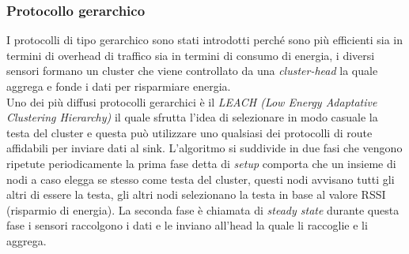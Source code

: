 \subsubsection{Protocollo gerarchico}
I protocolli di tipo gerarchico sono stati introdotti perché sono più efficienti sia in termini di overhead di traffico sia in termini di consumo di energia, i diversi sensori formano un cluster che viene controllato da una \emph{cluster-head} la quale aggrega e fonde i dati per risparmiare energia.\\
Uno dei più diffusi protocolli gerarchici è il \emph{LEACH (Low Energy Adaptative Clustering Hierarchy)} il quale sfrutta l'idea di selezionare in modo casuale la testa del cluster e questa può utilizzare uno qualsiasi dei protocolli di route affidabili per inviare dati al sink. L'algoritmo si suddivide in due fasi che vengono ripetute periodicamente la prima fase detta di \emph{setup} comporta che un insieme di nodi a caso elegga se stesso come testa del cluster, questi nodi avvisano tutti gli altri di essere la testa, gli altri nodi selezionano la testa in base al valore RSSI (risparmio di energia). La seconda fase è chiamata di \emph{steady state} durante questa fase i sensori raccolgono i dati e le inviano all'head la quale li raccoglie e li aggrega.